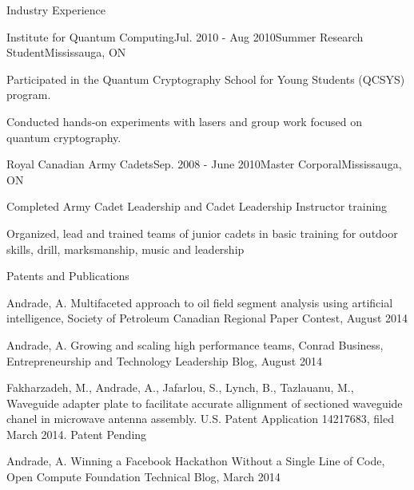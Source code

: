 \documentclass{resume} %
\begin{document}
\begin{rSection}{Industry Experience}
\begin{rSubsection}{Institute for Quantum Computing}{Jul. 2010 - Aug 2010}{Summer Research Student}{Mississauga, ON}
\item Participated in the Quantum Cryptography School for Young Students (QCSYS) program.
\item Conducted hands-on experiments with lasers and group work focused on quantum cryptography.
\end{rSubsection}

\begin{rSubsection}{Royal Canadian Army Cadets}{Sep. 2008 - June 2010}{Master Corporal}{Mississauga, ON}
\item Completed Army Cadet Leadership and Cadet Leadership Instructor training
\item Organized, lead and trained teams of junior cadets in basic training for outdoor skills, drill, marksmanship, music and leadership
\end{rSubsection}

\end{rSection}



\begin{rSection}{Patents and Publications}

\item Andrade, A.  Multifaceted approach to oil field segment analysis using artificial intelligence,  Society of Petroleum Canadian Regional Paper Contest, August 2014

\item Andrade, A.  Growing and scaling high performance teams,  Conrad Business, Entrepreneurship and Technology Leadership Blog, August 2014

\item Fakharzadeh, M., Andrade, A., Jafarlou, S., Lynch, B., Tazlauanu, M., Waveguide adapter plate to facilitate accurate allignment of sectioned waveguide chanel in microwave antenna assembly.  U.S. Patent Application 14217683, filed March 2014. Patent Pending

\item Andrade, A. Winning a Facebook Hackathon Without a Single Line of Code, Open Compute Foundation Technical Blog, March 2014

\end{rSection}
\end{document}
